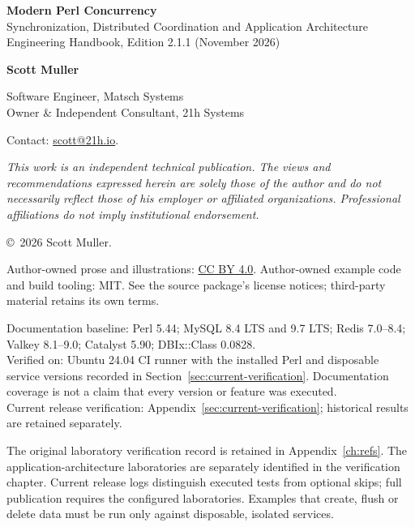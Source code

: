 \documentclass[11pt,openany]{book}
\begin{document}
\thispagestyle{empty}
\vspace*{\fill}
{\small\sffamily
\textbf{Modern Perl Concurrency}\\
Synchronization, Distributed Coordination and Application Architecture\\
Engineering Handbook, Edition 2.1.1 (November 2026)\par\medskip
\textbf{Scott Muller}\par
Software Engineer, Matsch Systems\\
Owner \& Independent Consultant, 21h Systems\par
Contact: \href{mailto:scott@21h.io}{scott@21h.io}.\par
\textit{This work is an independent technical publication. The views and recommendations expressed herein are solely those of the author and do not necessarily reflect those of his employer or affiliated organizations. Professional affiliations do not imply institutional endorsement.}\par
\copyright\ 2026 Scott Muller.\par\smallskip
Author-owned prose and illustrations: \href{https://creativecommons.org/licenses/by/4.0/}{CC BY 4.0}. Author-owned example code and build tooling: MIT. See the source package's license notices; third-party material retains its own terms.\par\bigskip
\color{muted}
Documentation baseline: Perl 5.44; MySQL 8.4 LTS and 9.7 LTS; Redis 7.0--8.4; Valkey 8.1--9.0; Catalyst 5.90; DBIx::Class 0.0828.\\
Verified on: Ubuntu 24.04 CI runner with the installed Perl and disposable service versions recorded in Section~\ref{sec:current-verification}. Documentation coverage is not a claim that every version or feature was executed. \\
Current release verification: Appendix~\ref{sec:current-verification}; historical results are retained separately.\par\medskip
The original laboratory verification record is retained in Appendix~\ref{ch:refs}. The application-architecture laboratories are separately identified in the verification chapter. Current release logs distinguish executed tests from optional skips; full publication requires the configured laboratories.
Examples that create, flush or delete data must be run only against disposable, isolated services.\par}
\clearpage
\end{document}
